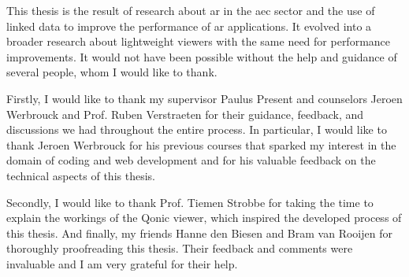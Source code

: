 {\huge{}}

This thesis is the result of research about \ac{ar} in the \ac{aec} sector and the use of linked data to improve the performance of \ac{ar} applications. It evolved into a broader research about lightweight viewers with the same need for performance improvements. It would not have been possible without the help and guidance of several people, whom I would like to thank.

Firstly, I would like to thank my supervisor Paulus Present and counselors Jeroen Werbrouck and Prof. Ruben Verstraeten for their guidance, feedback, and discussions we had throughout the entire process. In particular, I would like to thank Jeroen Werbrouck for his previous courses that sparked my interest in the domain of coding and web development and for his valuable feedback on the technical aspects of this thesis.

Secondly, I would like to thank Prof. Tiemen Strobbe for taking the time to explain the workings of the Qonic viewer, which inspired the developed process of this thesis. And finally, my friends Hanne den Biesen and Bram van Rooijen for thoroughly proofreading this thesis. Their feedback and comments were invaluable and I am very grateful for their help.